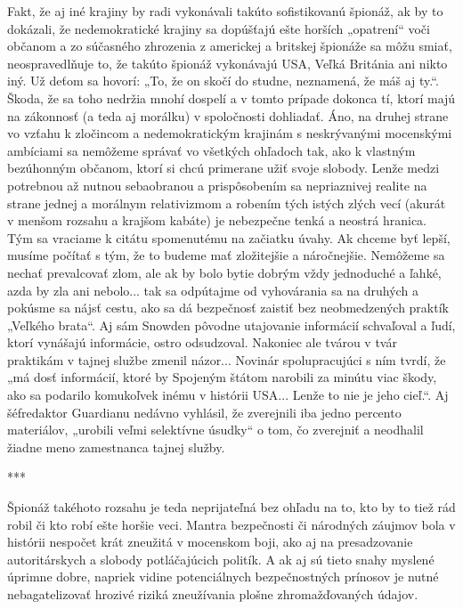 \documentclass{article}
\begin{document}
Fakt, že aj iné krajiny by radi vykonávali takúto sofistikovanú špionáž, ak by to dokázali, že nedemokratické krajiny sa dopúšťajú ešte horších „opatrení“ voči občanom a zo súčasného zhrozenia z americkej a britskej špionáže sa môžu smiať, neospravedlňuje to, že takúto špionáž vykonávajú USA, Veľká Británia ani nikto iný. Už deťom sa hovorí: „To, že on skočí do studne, neznamená, že máš aj ty.“. Škoda, že sa toho nedržia mnohí dospelí a v tomto prípade dokonca tí, ktorí majú na zákonnosť (a teda aj morálku) v spoločnosti dohliadať. Áno, na druhej strane vo vzťahu k zločincom a nedemokratickým krajinám s neskrývanými mocenskými ambíciami sa nemôžeme správať vo všetkých ohľadoch tak, ako k vlastným bezúhonným občanom, ktorí si chcú primerane užiť svoje slobody. Lenže medzi potrebnou až nutnou sebaobranou a prispôsobením sa nepriaznivej realite na strane jednej a morálnym relativizmom a robením tých istých zlých vecí (akurát v menšom rozsahu a krajšom kabáte) je nebezpečne tenká a neostrá hranica. Tým sa vraciame k citátu spomenutému na začiatku úvahy. Ak chceme byť lepší, musíme počítať s tým, že to budeme mať zložitejšie a náročnejšie. Nemôžeme sa nechať prevalcovať zlom, ale ak by bolo bytie dobrým vždy jednoduché a ľahké, azda by zla ani nebolo... tak sa odpútajme od vyhovárania sa na druhých a pokúsme sa nájsť cestu, ako sa dá bezpečnosť zaistiť bez neobmedzených praktík „Veľkého brata“. Aj sám Snowden pôvodne utajovanie informácií schvaľoval a ľudí, ktorí vynášajú informácie, ostro odsudzoval. \cite{techsme3} Nakoniec ale tvárou v tvár praktikám v tajnej službe zmenil názor... Novinár spolupracujúci s ním tvrdí, že „má dosť informácií, ktoré by Spojeným štátom narobili za minútu viac škody, ako sa podarilo komukoľvek inému v histórii USA... Lenže to nie je jeho cieľ.“. \cite{sme3} Aj šéfredaktor Guardianu nedávno vyhlásil, že zverejnili iba jedno percento materiálov, „urobili veľmi selektívne úsudky“ o tom, čo zverejniť a neodhalil žiadne meno zamestnanca tajnej služby. \cite{sme2}

\begin{center}
	***
\end{center}

Špionáž takéhoto rozsahu je teda neprijateľná bez ohľadu na to, kto by to tiež rád robil či kto robí ešte horšie veci. Mantra bezpečnosti či národných záujmov bola v histórii nespočet krát zneužitá v mocenskom boji, ako aj na presadzovanie autoritárskych a slobody potláčajúcich politík. A ak aj sú tieto snahy myslené úprimne dobre, napriek vidine potenciálnych bezpečnostných prínosov je nutné nebagatelizovať hrozivé riziká zneužívania plošne zhromažďovaných údajov.
\end{document}
